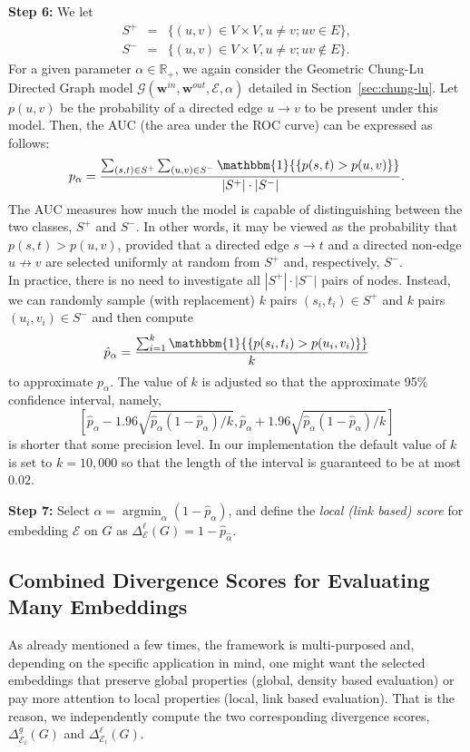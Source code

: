 \documentclass[11pt]{article}
\newcommand{\R}{{\mathbb R}}
\newcommand{\emb}{\mathcal E}
\DeclareMathOperator*{\argmin}{argmin}
\begin{document}
\medskip \noindent \textbf{Step 6:} We let
\begin{eqnarray*}
S^+ &=& \{ (u, v) \in V \times V, u \ne v ; uv \in E \}, \\
S^- &=& \{ (u, v) \in V \times V, u \ne v ; uv \notin E \}.
\end{eqnarray*}
For a given parameter $\alpha \in \R_+$, we again consider the Geometric Chung-Lu Directed Graph model $\mathcal{G}(\textbf{w}^{in}, \textbf{w}^{out}, \emb, \alpha)$ detailed in Section~\ref{sec:chung-lu}. Let $p(u,v)$ be the probability of a directed edge $u \rightarrow v$ to be present under this model.
Then, the AUC (the area under the ROC curve) can be expressed as follows:
$$
p_\alpha = \frac{\sum_{(s,t) \in S^+} \sum_{(u,v) \in S^-} \mathbbm{1}{\{ p(s,t) > p(u,v) \}}}{|S^+| \cdot |S^-|}.
$$
The AUC measures how much the model is capable of distinguishing between the two classes, $S^+$ and $S^-$. In other words, it may be viewed as the probability that $p(s,t) > p(u,v)$, provided that a directed edge $s \rightarrow t$ and a directed non-edge $u \not\rightarrow v$ are selected uniformly at random from $S^+$ and, respectively, $S^-$. \\
In practice, there is no need to investigate all $|S^+| \cdot |S^-|$ pairs of nodes. Instead, we can randomly sample (with replacement) $k$ pairs $(s_i,t_i) \in S^+$ and $k$ pairs $(u_i,v_i) \in S^-$ and then compute
$$
\hat{p}_\alpha = \frac{\sum_{i=1}^k \mathbbm{1}{\{ p(s_i,t_i) > p(u_i,v_i) \}}}{k}
$$
to approximate $p_\alpha$. The value of $k$ is adjusted so that the approximate 95\% confidence interval, namely,
$$
\left[ \hat{p}_\alpha - 1.96 \sqrt{\hat{p}_\alpha(1-\hat{p}_\alpha)/k}, \hat{p}_\alpha + 1.96 \sqrt{\hat{p}_\alpha(1-\hat{p}_\alpha)/k} \right]
$$
is shorter that some precision level. In our implementation the default value of $k$ is set to $k=10{,}000$ so that the length of the interval is guaranteed to be at most $0.02$.

\medskip \noindent \textbf{Step 7:}
Select $\hat{\alpha} = \argmin_{\alpha} (1-\hat{p}_\alpha)$, and define the \emph{local (link based) score} for embedding $\emb$ on $G$ as $\Delta_\emb^{\ell}(G) = 1-\hat{p}_{\hat{\alpha}}$. 

\subsection{Combined Divergence Scores for Evaluating Many Embeddings}\label{sec:many_embeddgins}

As already mentioned a few times, the framework is multi-purposed and, depending on the specific application in mind, one might want the selected embeddings that preserve global properties (global, density based evaluation) or pay more attention to local properties (local, link based evaluation). That is the reason, we independently compute the two corresponding divergence scores, $\Delta^{g}_{\emb_i}(G)$ and $\Delta^{\ell}_{\emb_i}(G)$.
\end{document}
